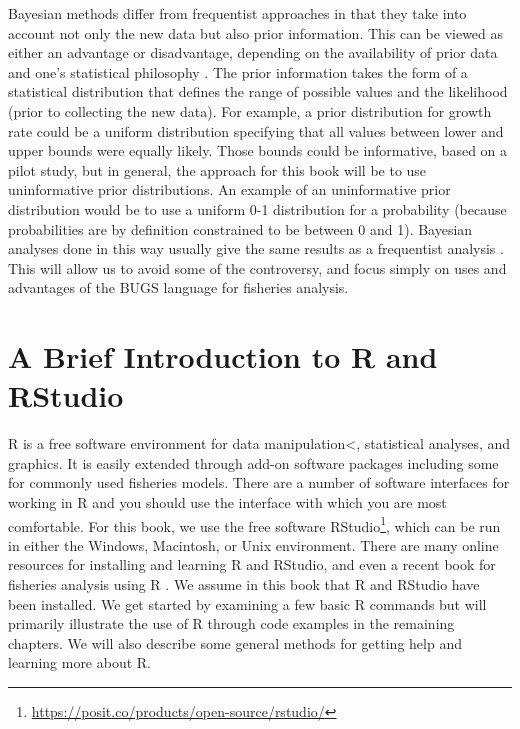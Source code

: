\documentclass[
]{krantz}
\renewcommand{\href}[2]{#2\footnote{\url{#1}}}
\begin{document}
Bayesian methods differ from frequentist approaches in that they take into account not only the new data but also prior information. This can be viewed as either an advantage or disadvantage, depending on the availability of prior data and one's statistical philosophy \citep{ellison_2004, mccarthy2007, kery_2010, kery.schaub_2011, dorazio_2016}. The prior information takes the form of a statistical distribution that defines the range of possible values and the likelihood (prior to collecting the new data). For example, a prior distribution for growth rate could be a uniform distribution specifying that all values between lower and upper bounds were equally likely. Those bounds could be informative, based on a pilot study, but in general, the approach for this book will be to use uninformative prior distributions. An example of an uninformative prior distribution would be to use a uniform 0-1 distribution for a probability (because probabilities are by definition constrained to be between 0 and 1). Bayesian analyses done in this way usually give the same results as a frequentist analysis \citep{mccarthy2007, kery_2010, kery.schaub_2011}. This will allow us to avoid some of the controversy, and focus simply on uses and advantages of the BUGS language for fisheries analysis.

\mainmatter

\hypertarget{R-intro}{%
\chapter{A Brief Introduction to R and RStudio}\label{R-intro}}

R \citep{R-base} is a free software environment for data manipulation\textless, statistical analyses, and graphics. It is easily extended through add-on software packages including some for commonly used fisheries models. There are a number of software interfaces for working in R and you should use the interface with which you are most comfortable. For this book, we use the free software \href{https://posit.co/products/open-source/rstudio/}{RStudio}, which can be run in either the Windows, Macintosh, or Unix environment. There are many online resources for installing and learning R and RStudio, and even a recent book for fisheries analysis using R \citep{ogle_2018}. We assume in this book that R and RStudio have been installed. We get started by examining a few basic R commands but will primarily illustrate the use of R through code examples in the remaining chapters. We will also describe some general methods for getting help and learning more about R.
\end{document}
